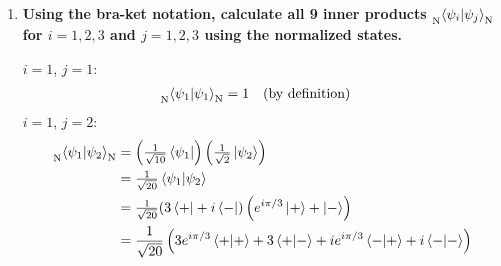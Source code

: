 \documentclass[11pt]{article}
\newcommand\abs[1]{\lvert#1\rvert}
\begin{document}
\begin{enumerate}[label=\textbf{\arabic*.}, start=2]
{\begin{enumerate}[label=\textbf{(\alph*)}]
{\begin{align*}
                        \abs{C}^2&=\frac 1 2 \\
                        C&=\frac{1}{\sqrt 2}
                    \end{align*}
                    Therefore, \(\ket{\psi_2}_\mathrm{N}=\frac{1}{\sqrt 2}\ket{\psi_2}=\frac{1}{\sqrt 2}e^{i\pi/3}\ket{+}+\frac{1}{\sqrt 2}\ket{-}\).
                    \par
                    For \(\ket{\psi_3}\):
                    \begin{align*}
                        \braket{C\psi_3|C\psi_3}&=1 \\
                        1&=C^*(-7i\bra{+}-2\bra{-})\cdot C(7i\ket{+}-2\ket{-}) \\
                        &=CC^*(-49i^2\braket{+|+}+14i\braket{+|-}-14i\braket{-|+}+4\braket{-|-}) \\
                        &=CC^*(49+4) \\
                        \abs{C}^2&=\frac{1}{53} \\
                        C&=\frac{1}{\sqrt{53}}
                    \end{align*}
                    Therefore, \(\ket{\psi_3}_\mathrm{N}=\frac{1}{\sqrt{53}}\ket{\psi_3}=\frac{7i}{\sqrt{53}}\ket{+}-\frac{2}{\sqrt{53}}\ket{-}\).
                }
                \item{
                    \textbf{\boldmath Using the bra-ket notation, calculate all 9 inner products \(\prescript{}{\mathrm{N}}{\braket{\psi_i|\psi_j}_\mathrm{N}}\) for \(i=1,2,3\) and \(j=1,2,3\) using the normalized states.}
                    \par
                    \(i=1\), \(j=1\):
                    \begin{align*}
                        \prescript{}{\mathrm{N}}{\braket{\psi_1|\psi_1}_\mathrm{N}}&=1\quad\text{(by definition)}
                    \end{align*}
                    \(i=1\), \(j=2\):
                    \begin{align*}
                        \prescript{}{\mathrm{N}}{\braket{\psi_1|\psi_2}_\mathrm{N}}&=\left(\tfrac{1}{\sqrt{10}}\bra{\psi_1}\right)\left(\tfrac{1}{\sqrt 2}\ket{\psi_2}\right) \\
                        &=\tfrac{1}{\sqrt{20}}\braket{\psi_1|\psi_2} \\
                        &=\tfrac{1}{\sqrt{20}}(3\bra{+}+i\bra{-})\left(e^{i\pi/3}\ket{+}+\ket{-}\right) \\
                        &=\frac{1}{\sqrt{20}}\left(3e^{i\pi/3}\braket{+|+}+3\braket{+|-}+ie^{i\pi/3}\braket{-|+}+i\braket{-|-}\right) \\

\end{align*}}
\end{enumerate}}
\end{enumerate}
\end{document}
